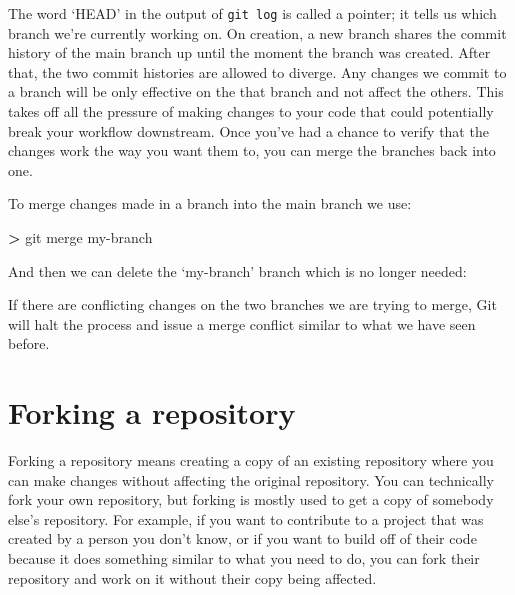 \documentclass[
]{book}
\newenvironment{Shaded}{\begin{snugshade}}{\end{snugshade}}
\newcommand{\AttributeTok}[1]{\textcolor[rgb]{0.13,0.29,0.53}{#1}}
\newcommand{\ExtensionTok}[1]{#1}
\newcommand{\NormalTok}[1]{#1}
\newcommand{\OperatorTok}[1]{\textcolor[rgb]{0.81,0.36,0.00}{\textbf{#1}}}
\begin{document}
The word `HEAD' in the output of \texttt{git\ log} is called a pointer; it tells us which branch we're currently working on. On creation, a new branch shares the commit history of the main branch up until the moment the branch was created. After that, the two commit histories are allowed to diverge. Any changes we commit to a branch will be only effective on the that branch and not affect the others. This takes off all the pressure of making changes to your code that could potentially break your workflow downstream. Once you've had a chance to verify that the changes work the way you want them to, you can merge the branches back into one.

To merge changes made in a branch into the main branch we use:

\begin{Shaded}
\begin{Highlighting}[]
\OperatorTok{\textgreater{}}\NormalTok{ git }\ExtensionTok{merge}\NormalTok{ my{-}branch}
\end{Highlighting}
\end{Shaded}

And then we can delete the `my-branch' branch which is no longer needed:

\begin{Shaded}
\end{Shaded}

If there are conflicting changes on the two branches we are trying to merge, Git will halt the process and issue a merge conflict similar to what we have seen before.

\hypertarget{forking-a-repository}{%
\section{Forking a repository}\label{forking-a-repository}}

Forking a repository means creating a copy of an existing repository where you can make changes without affecting the original repository. You can technically fork your own repository, but forking is mostly used to get a copy of somebody else's repository. For example, if you want to contribute to a project that was created by a person you don't know, or if you want to build off of their code because it does something similar to what you need to do, you can fork their repository and work on it without their copy being affected.
\end{document}

